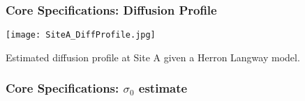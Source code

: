 \documentclass[../../CompleteThesis/Complete_1stDraft.tex]{subfiles}
\begin{document}
	\subsubsection[Diffusion Profile]{Core Specifications: Diffusion Profile}
	\label{Subsubsec:Method_FirstSigmaEstimate_PrelimComputations_DiffProfile}
	
	\begin{marginfigure}
		\centering
		\texttt{[image: SiteA\_DiffProfile.jpg]}
		\caption[Diffusion profile, Site A.]{\footnotesize{Estimated diffusion profile at Site A given a Herron Langway model.}}
		\label{fig:SiteADiffProfile}
	\end{marginfigure}
	
	\subsubsection[$\sigma_0$ estimate]{Core Specifications: $\sigma_0$ estimate}
	\label{Subsubsec:Method_FirstSigmaEstimate_PrelimComputations_Sigma0Estimate}
	
	
	
	
	
	
	
	
	
	
	
\end{document}
